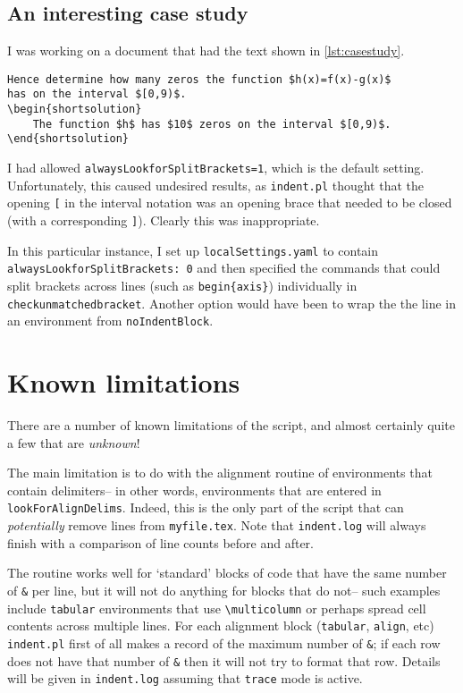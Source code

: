 \subsection{An interesting case study}
I was working on a document that had the text shown in \cref{lst:casestudy}. 
\begin{lstlisting}[caption={When to set \lstinline!alwaysLookforSplitBrackets=0!},label={lst:casestudy}]
Hence determine how many zeros the function $h(x)=f(x)-g(x)$
has on the interval $[0,9)$.
\begin{shortsolution}
	The function $h$ has $10$ zeros on the interval $[0,9)$.
\end{shortsolution}
	\end{lstlisting}
I had allowed \lstinline!alwaysLookforSplitBrackets=1!, which is the default setting. 
Unfortunately, this caused undesired results, as \lstinline!indent.pl! thought that the opening 
\lstinline![!  in the interval notation 
was an opening brace that needed to be closed (with a corresponding \lstinline!]!). Clearly 
this was inappropriate. 

In this particular instance, I set up \lstinline!localSettings.yaml! 
to contain \lstinline!alwaysLookforSplitBrackets: 0! and then specified the commands 
that could split brackets across lines (such as \lstinline!begin{axis}!) individually
in \lstinline!checkunmatchedbracket!.  Another option would have been to wrap the 
the line in an environment from \lstinline!noIndentBlock!.

 	 	 	 	 	
\section{Known limitations}\label{sec:knownlimitations}
There are a number of known limitations of the script, and almost certainly quite a
few that are \emph{unknown}!
      
The main limitation is to do with the alignment routine of environments that contain 
delimiters-- in other words, environments that are entered in \lstinline!lookForAlignDelims!.
Indeed, this is the only part of the script that can \emph{potentially} remove 
lines from \lstinline!myfile.tex!. Note that \lstinline!indent.log! will always
finish with a comparison of line counts before and after. 
      
The routine works well for `standard' blocks of code that have the same number of \lstinline!&!
per line, but it will not do anything for blocks that do not-- such examples 
include \lstinline!tabular! environments that use \lstinline!\multicolumn! or 
perhaps spread cell contents across multiple lines.  For each alignment block (\lstinline!tabular!, 
\lstinline!align!, etc) \lstinline!indent.pl! first of all makes a record 
of the maximum number of \lstinline!&!; if each row does not have that 
number of \lstinline!&! then it will not try to format that row. Details 
will be given in \lstinline!indent.log! assuming that \lstinline!trace! mode
is active.

